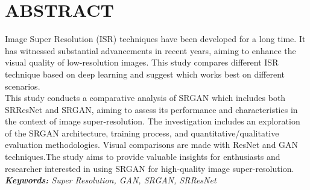 \newpage

\section*{ABSTRACT}
Image Super Resolution (ISR) techniques have been developed for a long time. It has witnessed substantial advancements in recent years, aiming to enhance the visual quality of low-resolution images. This study compares different ISR technique based on deep learning and suggest which works best on different scenarios.\\
This study conducts a comparative analysis of SRGAN which includes both SRResNet and SRGAN, aiming to assess its performance and characteristics in the context of image super-resolution. The investigation includes an exploration of the SRGAN architecture, training process, and quantitative/qualitative evaluation methodologies. Visual comparisons are made with ResNet and GAN techniques.The study aims to provide valuable insights for enthusiasts and researcher interested in using SRGAN for high-quality image super-resolution.\\
\textit {{\bf Keywords:}  Super Resolution, GAN, SRGAN, SRResNet }